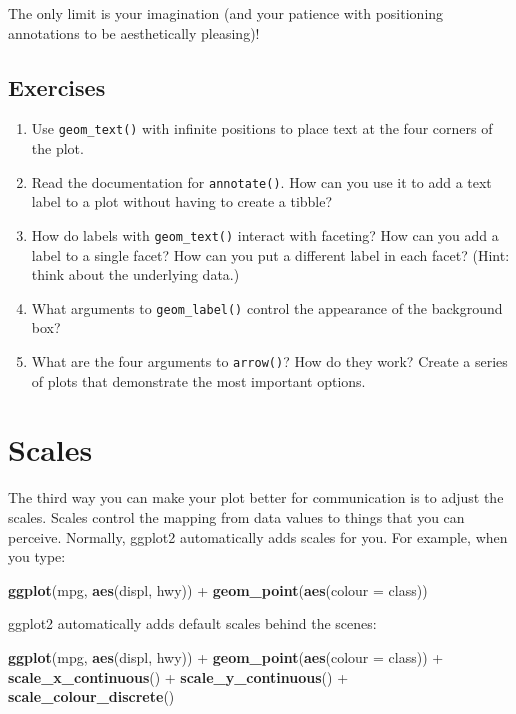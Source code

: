 \documentclass[]{book}
\newenvironment{Shaded}{\begin{snugshade}}{\end{snugshade}}
\newcommand{\KeywordTok}[1]{\textcolor[rgb]{0.13,0.29,0.53}{\textbf{{#1}}}}
\newcommand{\DataTypeTok}[1]{\textcolor[rgb]{0.13,0.29,0.53}{{#1}}}
\newcommand{\StringTok}[1]{\textcolor[rgb]{0.31,0.60,0.02}{{#1}}}
\newcommand{\NormalTok}[1]{{#1}}
\begin{document}
The only limit is your imagination (and your patience with positioning
annotations to be aesthetically pleasing)!

\subsection{Exercises}\label{exercises-72}

\begin{enumerate}
\def\labelenumi{\arabic{enumi}.}
\item
  Use \texttt{geom\_text()} with infinite positions to place text at the
  four corners of the plot.
\item
  Read the documentation for \texttt{annotate()}. How can you use it to
  add a text label to a plot without having to create a tibble?
\item
  How do labels with \texttt{geom\_text()} interact with faceting? How
  can you add a label to a single facet? How can you put a different
  label in each facet? (Hint: think about the underlying data.)
\item
  What arguments to \texttt{geom\_label()} control the appearance of the
  background box?
\item
  What are the four arguments to \texttt{arrow()}? How do they work?
  Create a series of plots that demonstrate the most important options.
\end{enumerate}

\section{Scales}\label{scales}

The third way you can make your plot better for communication is to
adjust the scales. Scales control the mapping from data values to things
that you can perceive. Normally, ggplot2 automatically adds scales for
you. For example, when you type:

\begin{Shaded}
\begin{Highlighting}[]
\KeywordTok{ggplot}\NormalTok{(mpg, }\KeywordTok{aes}\NormalTok{(displ, hwy)) +}
\StringTok{  }\KeywordTok{geom_point}\NormalTok{(}\KeywordTok{aes}\NormalTok{(}\DataTypeTok{colour =} \NormalTok{class))}
\end{Highlighting}
\end{Shaded}

ggplot2 automatically adds default scales behind the scenes:

\begin{Shaded}
\begin{Highlighting}[]
\KeywordTok{ggplot}\NormalTok{(mpg, }\KeywordTok{aes}\NormalTok{(displ, hwy)) +}
\StringTok{  }\KeywordTok{geom_point}\NormalTok{(}\KeywordTok{aes}\NormalTok{(}\DataTypeTok{colour =} \NormalTok{class)) +}
\StringTok{  }\KeywordTok{scale_x_continuous}\NormalTok{() +}
\StringTok{  }\KeywordTok{scale_y_continuous}\NormalTok{() +}
\StringTok{  }\KeywordTok{scale_colour_discrete}\NormalTok{()}
\end{Highlighting}
\end{Shaded}
\end{document}
